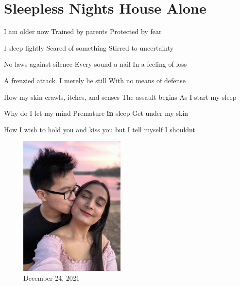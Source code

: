 \documentclass[
]{book}
\newenvironment{Shaded}{\begin{snugshade}}{\end{snugshade}}
\newcommand{\ControlFlowTok}[1]{\textcolor[rgb]{0.13,0.29,0.53}{\textbf{#1}}}
\newcommand{\NormalTok}[1]{#1}
\newcommand{\StringTok}[1]{\textcolor[rgb]{0.31,0.60,0.02}{#1}}
\begin{document}
\hypertarget{sleepless-nights-house-alone}{%
\chapter{Sleepless Nights House Alone}\label{sleepless-nights-house-alone}}

\begin{Shaded}
\begin{Highlighting}[]
\NormalTok{I am older now}
\NormalTok{Trained by parents}
\NormalTok{Protected by fear}

\NormalTok{I sleep lightly}
\NormalTok{Scared of something}
\NormalTok{Stirred to uncertainty}

\NormalTok{No laws against silence}
\NormalTok{Every sound a nail}
\NormalTok{In a feeling of loss }

\NormalTok{A frenzied attack.}
\NormalTok{I merely lie still}
\NormalTok{With no means of defense}

\NormalTok{How my skin crawls, itches, and senses}
\NormalTok{The assault begins}
\NormalTok{As I start my sleep}

\NormalTok{Why do I let my mind}
\NormalTok{Premature }\ControlFlowTok{in}\NormalTok{ sleep}
\NormalTok{Get under my skin}

\NormalTok{How I wish to hold you }
\NormalTok{and kiss you}
\NormalTok{but I tell myself I shouldn}\StringTok{\textquotesingle{}t}
\end{Highlighting}
\end{Shaded}

\begin{figure}
\centering
\includegraphics[width=2.08333in,height=\textheight]{mimages/14.1 12-24-2021.jpg}
\caption{December 24, 2021}
\end{figure}
\end{document}
